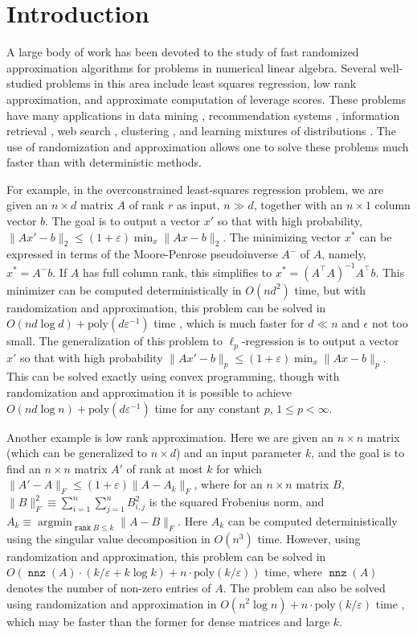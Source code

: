 \documentclass{sig-alternate}
\DeclareMathOperator{\nnz}{\mathtt{nnz}}
\DeclareMathOperator{\rank}{\mathtt{rank}}
\DeclareMathOperator{\argmin}{\mathrm{argmin}}
\newcommand{\poly}{{\mathrm{poly}}}
\newcommand{\eps}{\varepsilon}
\begin{document}
\ifSTOC
{}
\fi

\section{Introduction}
A large body of work has been devoted to the study of fast randomized 
approximation algorithms for problems in numerical linear algebra. Several well-studied
problems in this area include
least squares regression, low rank approximation, 
and approximate computation of leverage scores. These problems have many applications
in data mining \cite{afkms01}, recommendation systems \cite{dkr02}, 
information retrieval \cite{prtv00},
web search \cite{afkm01,k99}, clustering \cite{dfkvv04,m01}, and learning mixtures of distributions \cite{ksv08,am05}. 
The use of randomization
and approximation allows one to solve these problems much faster than with deterministic
methods. 

For example, in the overconstrained least-squares regression problem, we are given an $n \times d$
matrix $A$ of rank $r$ as input, $n \gg d$, together with an $n \times 1$ column vector $b$. The goal is to 
output a vector $x'$ so that with high probability, 
$\|Ax'-b\|_2 \leq (1+\eps)\min_x \|Ax-b\|_2$.
The minimizing vector $x^*$ can be expressed in terms of the Moore-Penrose pseudoinverse $A^-$ of $A$, 
namely, $x^* = A^-b$. If $A$ has full column rank, this simplifies to $x^* = (A^\top A)^{-1}A^\top b$. 
This minimizer can be computed deterministically in $O(nd^2)$ time, but
with randomization and approximation, 
this problem can be solved in $O(nd \log d) + \poly(d \eps^{-1})$ time \cite{s06,dmms11}, 
which is much faster for $d \ll n$ and $\epsilon$ not too small. The generalization of this problem
to $\ell_p$-regression is to output a vector $x'$ so that with high probability
$\|Ax'-b\|_p \leq (1+\eps)\min_x \|Ax-b\|_p$. This can be solved exactly using convex programming,
though with randomization and approximation it is possible to achieve $O(nd \log n) + \poly(d \eps^{-1})$
time \cite{CDMMMW} for any constant $p$, $1 \leq p < \infty$. 

Another example is low rank approximation. Here we are given an $n \times n$ matrix (which can
be generalized to $n \times d$) and an input parameter $k$, and the goal is to find
an $n \times n$ matrix $A'$ of rank at most $k$ for which $\|A'-A\|_F \leq (1+\eps)\|A-A_k\|_F$,
where for an $n \times n$ matrix $B$, $\|B\|^2_F \equiv \sum_{i=1}^n \sum_{j=1}^n B_{i,j}^2$ is the
squared Frobenius norm, and $A_k\equiv \argmin_{\rank B \le k }\|A-B\|_F$.
Here $A_k$ can be computed deterministically using the singular value decomposition in $O(n^3)$ time. 
However, using randomization and approximation, this problem can be solved in  $O(\nnz(A) \cdot (k/\eps + k \log k) +
n \cdot \poly(k/\eps))$ time\cite{s06, cw09}, where  $\nnz(A)$ denotes the number of non-zero entries of $A$. 
The problem can also be solved using randomization and approximation in
$O(n^2 \log n) + n \cdot \poly(k/\eps)$ time \cite{s06}, 
which may be faster than the former for dense matrices and large $k$. 
\end{document}
